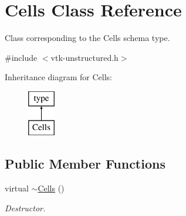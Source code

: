 \hypertarget{classCells}{}\section{Cells Class Reference}
\label{classCells}


Class corresponding to the Cells schema type.  




{\ttfamily \#include $<$vtk-\/unstructured.\+h$>$}

Inheritance diagram for Cells\+:\begin{figure}[H]
\begin{center}
\leavevmode
\includegraphics[height=2.000000cm]{classCells}
\end{center}
\end{figure}
\subsection*{Public Member Functions}
\begin{DoxyCompactItemize}
\item 
virtual \hyperlink{classCells_aab121634db81b439226a33fd099fb3c1}{$\sim$\+Cells} ()
\begin{DoxyCompactList}\small\item\em Destructor. \end{DoxyCompactList}\end{DoxyCompactItemize}
